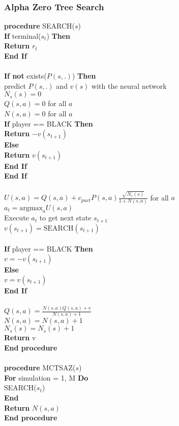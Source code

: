 \documentclass{article}
\begin{document}
\subsubsection{Alpha Zero Tree Search}
\textbf{procedure} SEARCH($s$) \\
\indent \textbf{If} terminal($s_t$) \textbf{Then} \\
\indent \indent \textbf{Return} $r_t$ \\
\indent \textbf{End If} \\
\\
\indent \textbf{If not} exists($P(s, .)$) \textbf{Then} \\
\indent \indent predict $P(s, .)$ and $v(s)$ with the neural network \\
\indent \indent $N_s(s) = 0$ \\
\indent \indent $Q(s, a) = 0$ for all $a$ \\
\indent \indent $N(s, a) = 0$ for all $a$ \\
\indent \indent \textbf{If} player == BLACK \textbf{Then} \\
\indent \indent \indent \textbf{Return} $-v(s_{t+1})$ \\
\indent \indent \textbf{Else} \\
\indent \indent \indent \textbf{Return} $v(s_{t+1})$ \\
\indent \indent \textbf{End If} \\
\indent \textbf{End If} \\
\\
\indent $U(s,a) = Q(s,a) + c_{puct} P(s,a) \frac{\sqrt{N_s(s)}}{1 + N(s,a)}$ for all $a$ \\
\indent $a_t = \text{argmax}_a U(s,a)$ \\
\indent Execute $a_t$ to get next state $s_{t+1}$ \\
\indent $v(s_{t+1}) = \text{SEARCH}(s_{t+1})$ \\
\\
\indent \textbf{If} player == BLACK \textbf{Then} \\
\indent \indent $v = -v(s_{t+1})$ \\
\indent \textbf{Else} \\
\indent \indent $v = v(s_{t+1})$ \\
\indent \textbf{End If} \\
\\
\indent $Q(s,a) = \frac{N(s,a) Q(s,a) + v}{N(s,a) + 1}$ \\
\indent $N(s,a) = N(s,a) + 1$ \\
\indent $N_s(s) = N_s(s) + 1$ \\
\indent \textbf{Return} v \\
\textbf{End procedure} \\
\\
\textbf{procedure} MCTSAZ($s$) \\
\indent \textbf{For} simulation = 1, M \textbf{Do} \\
\indent \indent SEARCH($s_t$) \\
\indent \textbf{End} \\
\indent \textbf{Return} $N(s,a)$\\
\textbf{End procedure} \\
\end{document}
